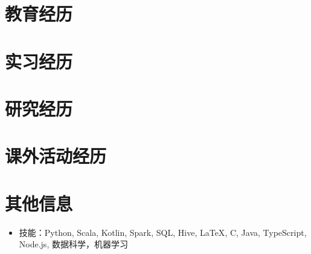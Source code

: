 \documentclass{resumeZH}
\begin{document}
\section{教育经历}

\pennmaster
\thuundergrad
\umnexchange

\section{实习经历}

\amazon
\msra
\bytedance
\continental
\summitview

\section{研究经历}

\ryanresearch
\umnresearch
\fifaresearch

\section{课外活动经历}

\eydatascience
\cnkibibtex
\cydp
\tkd
\semtech

\section{其他信息}

\vspace{0.618ex}
\begin{itemize}
\item 技能：Python, Scala, Kotlin, Spark, SQL, Hive, {\LaTeX}, C, Java, TypeScript, Node.js, 数据科学，机器学习
\end{itemize}
\end{document}
